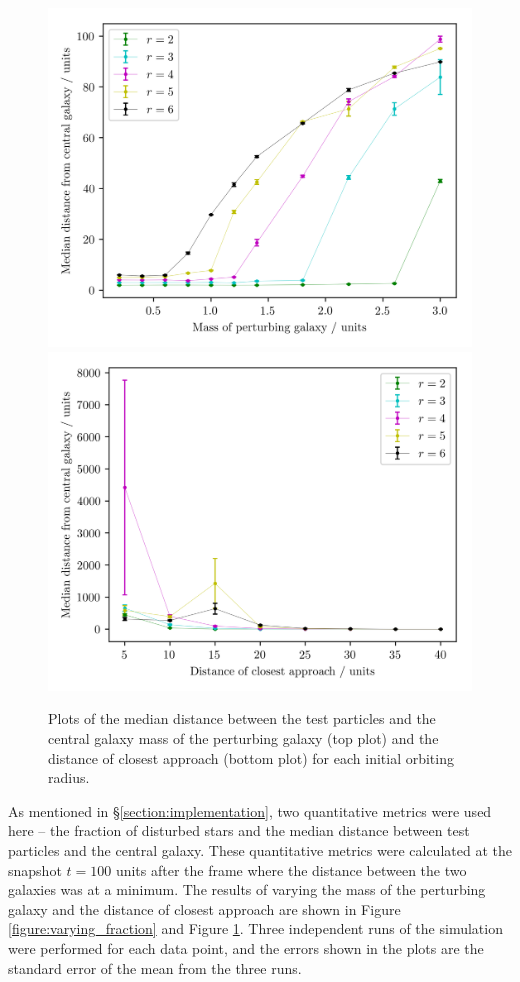 \documentclass[twoside,twocolumn]{article}
\begin{document}
        \begin{figure}
            \centering
            \includegraphics[width=\linewidth]{images/plot_distance_mass.png}
            \includegraphics[width=\linewidth]{images/plot_distance_rmin.png}
            \caption{Plots of the median distance between the test particles and the central galaxy mass of the perturbing galaxy (top plot) and the distance of closest approach (bottom plot) for each initial orbiting radius.}
            \label{figure:varying_distance}
        \end{figure}

        As mentioned in \S \ref{section:implementation}, two quantitative metrics were used here -- the fraction of disturbed stars and the median distance between test particles and the central galaxy. These quantitative metrics were calculated at the snapshot $t = 100$ units after the frame where the distance between the two galaxies was at a minimum. The results of varying the mass of the perturbing galaxy and the distance of closest approach are shown in Figure \ref{figure:varying_fraction} and Figure \ref{figure:varying_distance}. Three independent runs of the simulation were performed for each data point, and the errors shown in the plots are the standard error of the mean from the three runs. 
        
\end{document}

